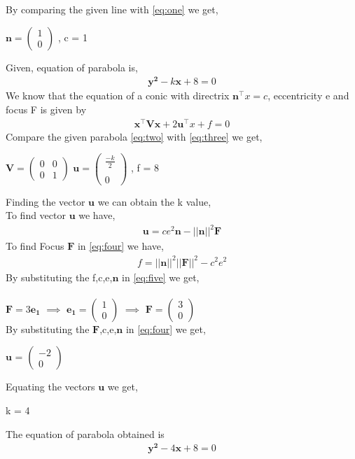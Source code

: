 \documentclass[journal,12pt,twocolumn]{IEEEtran}
\newcommand{\myvec}[1]{\ensuremath{\begin{pmatrix}#1\end{pmatrix}}}
\let\vec\mathbf
\begin{document}
By comparing the given line with \eqref{eq:one} we get, 
\begin{center}
$\vec{n} = \myvec{1\\0}$ , c = 1 
\end{center}
Given, equation of parabola is,
\begin{align}
\label{eq:two}
\vec{y^2}-k\vec{x}+8=0 
\end{align}
We know that the equation of a conic with directrix $\vec{n}^\top x = c$, eccentricity e and focus F is given by 
\begin{align}
\label{eq:three}
\vec{x^\top Vx}+2\vec{u^\top}x+f = 0 
\end{align}
Compare the given parabola \eqref{eq:two} with \eqref{eq:three} we get,
\begin{center}
$\vec{V} = \myvec{0&0\\0&1}$ $\vec{u} = \myvec{\frac{-k}{2} \\ \\ 0}$ , f = 8
\end{center}
Finding the vector $\vec{u}$ we can obtain the k value,\\ 
To find vector $\vec{u}$ we have,
\begin{align}
\label{eq:four}
\vec{u}=ce^2\vec{n}-||\vec{n}||^2\vec{F}
\end{align}
To find Focus $\vec{F}$ in \eqref{eq:four} we have,
\begin{align}
\label{eq:five}
f = ||\vec{n}||^2||\vec{F}||^2-c^2e^2
\end{align}
By substituting the f,c,e,$\vec{n}$ in \eqref{eq:five} we get,\\
\\$\vec{F} = 3\vec{e_1}$ $\implies$ $\vec{e_1} = \myvec{1 \\ 0}$ $\implies$ $\vec{F} = \myvec{3 \\ 0}$\\
By substituting the $\vec{F}$,c,e,$\vec{n}$ in \eqref{eq:four} we get,
\begin{center}
$\vec{u}$ = $\myvec{-2 \\ 0}$
\end{center}
Equating the vectors $\vec{u}$ we get,
\begin{center}
k = 4
\end{center}
The equation of parabola obtained is 
\begin{align}
\vec{y^2}-4\vec{x}+8=0 
\end{align}
\end{document}
